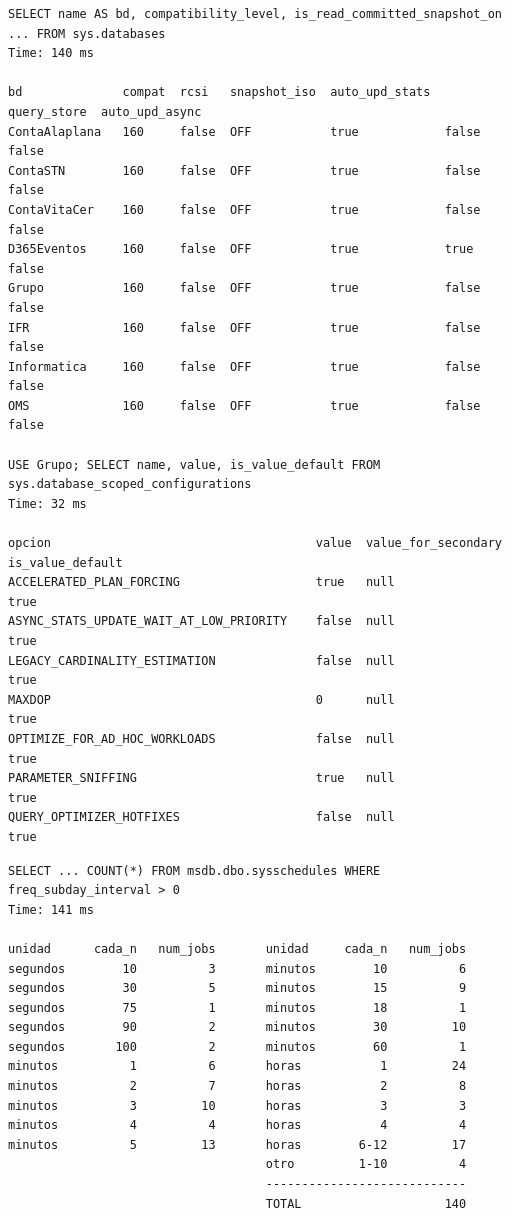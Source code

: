 \documentclass[11pt,a4paper]{article}
\begin{document}
\begin{lstlisting}[style=salida]
SELECT name AS bd, compatibility_level, is_read_committed_snapshot_on ... FROM sys.databases
Time: 140 ms

bd              compat  rcsi   snapshot_iso  auto_upd_stats  query_store  auto_upd_async
ContaAlaplana   160     false  OFF           true            false        false
ContaSTN        160     false  OFF           true            false        false
ContaVitaCer    160     false  OFF           true            false        false
D365Eventos     160     false  OFF           true            true         false
Grupo           160     false  OFF           true            false        false
IFR             160     false  OFF           true            false        false
Informatica     160     false  OFF           true            false        false
OMS             160     false  OFF           true            false        false

USE Grupo; SELECT name, value, is_value_default FROM sys.database_scoped_configurations
Time: 32 ms

opcion                                     value  value_for_secondary  is_value_default
ACCELERATED_PLAN_FORCING                   true   null                 true
ASYNC_STATS_UPDATE_WAIT_AT_LOW_PRIORITY    false  null                 true
LEGACY_CARDINALITY_ESTIMATION              false  null                 true
MAXDOP                                     0      null                 true
OPTIMIZE_FOR_AD_HOC_WORKLOADS              false  null                 true
PARAMETER_SNIFFING                         true   null                 true
QUERY_OPTIMIZER_HOTFIXES                   false  null                 true
\end{lstlisting}

\begin{lstlisting}[style=salida]
SELECT ... COUNT(*) FROM msdb.dbo.sysschedules WHERE freq_subday_interval > 0
Time: 141 ms

unidad      cada_n   num_jobs       unidad     cada_n   num_jobs
segundos        10          3       minutos        10          6
segundos        30          5       minutos        15          9
segundos        75          1       minutos        18          1
segundos        90          2       minutos        30         10
segundos       100          2       minutos        60          1
minutos          1          6       horas           1         24
minutos          2          7       horas           2          8
minutos          3         10       horas           3          3
minutos          4          4       horas           4          4
minutos          5         13       horas        6-12         17
                                    otro         1-10          4
                                    ----------------------------
                                    TOTAL                    140
\end{lstlisting}
\end{document}
